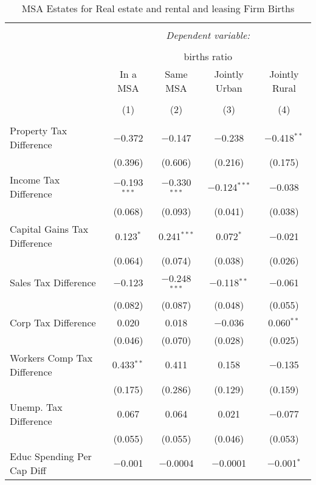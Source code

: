 
\begin{table}[!htbp] \centering 
  \caption{MSA Estates for  Real estate and rental and leasing Firm Births} 
  \label{} 
\begin{tabular}{@{\extracolsep{5pt}}lcccc} 
\\[-1.8ex]\hline 
\hline \\[-1.8ex] 
 & \multicolumn{4}{c}{\textit{Dependent variable:}} \\ 
\cline{2-5} 
\\[-1.8ex] & \multicolumn{4}{c}{births ratio} \\ 
 & In a MSA & Same MSA & Jointly Urban & Jointly Rural \\ 
\\[-1.8ex] & (1) & (2) & (3) & (4)\\ 
\hline \\[-1.8ex] 
 Property Tax Difference & $-$0.372 & $-$0.147 & $-$0.238 & $-$0.418$^{**}$ \\ 
  & (0.396) & (0.606) & (0.216) & (0.175) \\ 
  Income Tax Difference & $-$0.193$^{***}$ & $-$0.330$^{***}$ & $-$0.124$^{***}$ & $-$0.038 \\ 
  & (0.068) & (0.093) & (0.041) & (0.038) \\ 
  Capital Gains Tax Difference & 0.123$^{*}$ & 0.241$^{***}$ & 0.072$^{*}$ & $-$0.021 \\ 
  & (0.064) & (0.074) & (0.038) & (0.026) \\ 
  Sales Tax Difference & $-$0.123 & $-$0.248$^{***}$ & $-$0.118$^{**}$ & $-$0.061 \\ 
  & (0.082) & (0.087) & (0.048) & (0.055) \\ 
  Corp Tax Difference & 0.020 & 0.018 & $-$0.036 & 0.060$^{**}$ \\ 
  & (0.046) & (0.070) & (0.028) & (0.025) \\ 
  Workers Comp Tax Difference & 0.433$^{**}$ & 0.411 & 0.158 & $-$0.135 \\ 
  & (0.175) & (0.286) & (0.129) & (0.159) \\ 
  Unemp. Tax Difference & 0.067 & 0.064 & 0.021 & $-$0.077 \\ 
  & (0.055) & (0.055) & (0.046) & (0.053) \\ 
  Educ Spending Per Cap Diff & $-$0.001 & $-$0.0004 & $-$0.0001 & $-$0.001$^{*}$ \\ 

\end{tabular}
\end{table}
